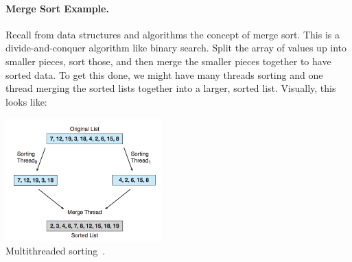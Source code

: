 \paragraph{Merge Sort Example.}
Recall from data structures and algorithms the concept of merge sort. This is a divide-and-conquer algorithm like binary search. Split the array of values up into smaller pieces, sort those, and then merge the smaller pieces together to have sorted data. To get this done, we might have many threads sorting and one thread merging the sorted lists together into a larger, sorted list. Visually, this looks like:

\begin{center}
	\includegraphics[width=0.45\textwidth]{images/multithread-sort.png}\\
	Multithreaded sorting~\cite{osc}.
\end{center}




